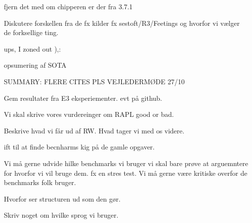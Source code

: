 
fjern det med om chipperen er der fra 3.7.1



Diskutere forskellen fra de fx kilder fx sestoft/R3/Feetings og hvorfor vi vælger de forksellige ting. 

ups, I zoned out ),:

opsumering af SOTA 

SUMMARY: FLERE CITES PLS
VEJLEDERMØDE 27/10



Gem resultater fra E3 eksperiementer. evt på github.



Vi skal skrive vores vurdereinger om RAPL good or bad. 

Beskrive hvad vi får ud af RW. Hvad tager vi med os videre.

ift til at finde becnharms kig på de gamle opgaver. 

Vi må gerne udvide hilke benchmarks vi bruger vi skal bare prøve at arguemntere for hvorfor vi vil bruge dem. fx en stres test. Vi må gerne være kritiske overfor de benchmarks folk bruger.



Hvorfor ser structuren ud som den gør.

Skriv noget om hvilke sprog vi bruger. 




